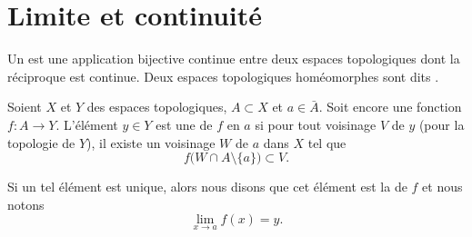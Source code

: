 
\section{Limite et continuité}

\begin{definition}
    Un  est une application bijective continue entre deux espaces topologiques dont la réciproque est continue. Deux espaces topologiques homéomorphes sont dits .
\end{definition}

\begin{definition}\label{DefYNVoWBx}
    Soient \( X\) et \( Y\) des espaces topologiques, \( A\subset X\) et \( a\in\bar A\). Soit encore une fonction \( f\colon A\to Y\). L'élément \( y\in Y\) est une  de \( f\) en \( a\) si pour tout voisinage \( V\) de \( y\) (pour la topologie de \( Y\)), il existe un voisinage \( W\) de \( a\) dans \( X\) tel que
    \begin{equation}
        f\big( W\cap A\setminus\{a\} \big)\subset V.
    \end{equation}

    Si un tel élément est unique, alors nous disons que cet élément est la  de \( f\) et nous notons
    \begin{equation}
        \lim_{x\to a} f(x)=y.
    \end{equation}
\end{definition}

